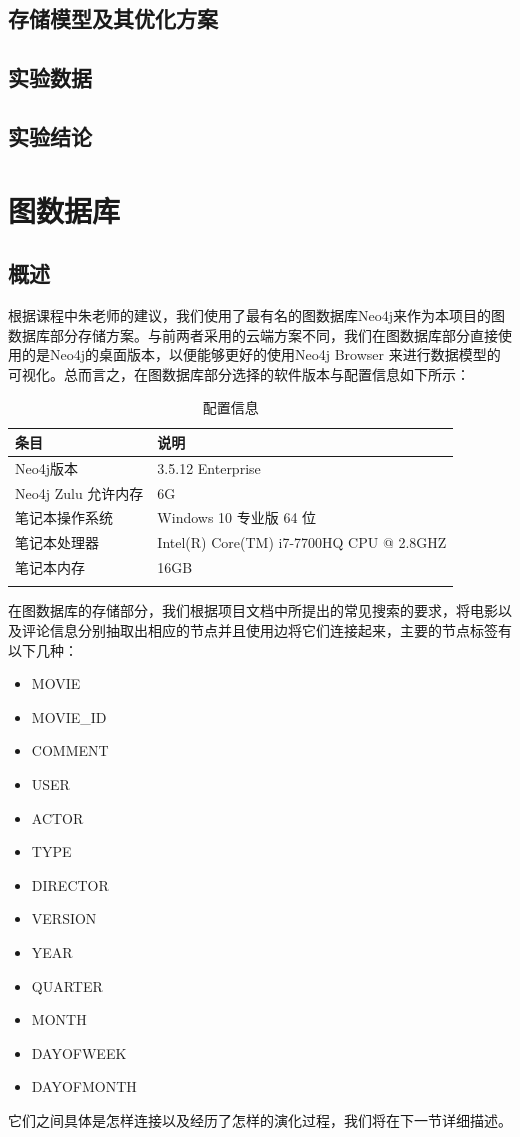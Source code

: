 \documentclass{ctexrep}
\begin{document}
	\subsection{存储模型及其优化方案}
	\subsection{实验数据}
	\subsection{实验结论}
	
	\section{图数据库}
	\subsection{概述}
	根据课程中朱老师的建议，我们使用了最有名的图数据库Neo4j来作为本项目的图数据库部分存储方案。与前两者采用的云端方案不同，我们在图数据库部分直接使用的是Neo4j的桌面版本，以便能够更好的使用Neo4j Browser 来进行数据模型的可视化。总而言之，在图数据库部分选择的软件版本与配置信息如下所示：
	\begin{longtable}{l|l}
		\hline
		条目 & 说明\\
		\hline
		\hline
		Neo4j版本 & 3.5.12 Enterprise\\
		Neo4j Zulu 允许内存 & 6G \\
		\hline
		笔记本操作系统 & Windows 10 专业版 64 位 \\
		笔记本处理器 & Intel(R) Core(TM) i7-7700HQ CPU @ 2.8GHZ \\
		笔记本内存 & 16GB\\
		\hline
		\caption{配置信息}
	\end{longtable}
	在图数据库的存储部分，我们根据项目文档中所提出的常见搜索的要求，将电影以及评论信息分别抽取出相应的节点并且使用边将它们连接起来，主要的节点标签有以下几种：\begin{itemize}
	  	\item MOVIE
	  	\item MOVIE\_ID
	  	\item COMMENT
	  	\item USER
	  	\item ACTOR
	  	\item TYPE
	  	\item DIRECTOR
	  	\item VERSION
	  	\item YEAR
	  	\item QUARTER
	  	\item MONTH
	  	\item DAYOFWEEK
	  	\item DAYOFMONTH
	\end{itemize}
	它们之间具体是怎样连接以及经历了怎样的演化过程，我们将在下一节详细描述。
\end{document}
